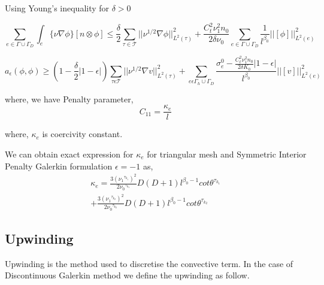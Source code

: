 \documentclass[a4paper]{book}
\begin{document}
Using Young's inequality for $\delta > 0$

\begin{equation}
\sum_{e \in \Gamma \cup \Gamma_D} \int_e \lbrace \nu \nabla \phi \rbrace [n \otimes \phi] \leq \frac{\delta}{2} \sum_{\tau \in \mathcal{T}} ||\nu^{1/2} \nabla \phi ||^2_{L^2(\tau)} +  \frac{C_t^2 \nu_1^2 n_0}{2 \delta \nu_0}  \sum_{e \in \Gamma \cup \Gamma_D} \frac{1}{l^{\beta_0}} ||[\phi]||^2_{L^2(e)}
\end{equation}


\begin{equation}
a_\epsilon (\phi , \phi) \geq \left( 1-\frac{\delta}{2} |1-\epsilon| \right) \sum_{\tau \epsilon \mathcal{T}} ||\nu^{1/2} \nabla v ||^2_{L^2(\tau)} + \sum_{e \epsilon \Gamma_h \cup \Gamma_D} \frac{\sigma_e^0 - \frac{C_t^2 \nu_1^2 n_0}{2 \delta K_0}|1-\epsilon|}{l^{\beta_0}} ||[v]||^2_{L^2(e)}
\end{equation}

where, we have Penalty parameter,
\begin{equation}
C_{11} = \frac{\kappa_e}{l}
\end{equation} 

where, $\kappa_e$ is coercivity constant.

We can obtain exact expression for $\kappa_e$ for triangular mesh and Symmetric Interior Penalty Galerkin formulation $\epsilon = -1$ as,\\
\begin{equation}
\begin{split}
\kappa_e = \frac{3 ( {\nu_1}^{\tau_{k_1}})^2}{2 {\nu_0}^{\tau_{k_1}}} D (D+1) l^{\beta_0 - 1} cot {\theta^{\tau_{k_1}}}  \\ + \frac{3 ( {\nu_1}^{\tau_{k_2}})^2}{2 {\nu_0}^{\tau_{k_2}}} D (D+1) l^{\beta_0 - 1} cot {\theta^{\tau_{k_2}}}
\end{split}
\end{equation} 

\subsection{Upwinding} \label{upwinding}

Upwinding is the method used to discretise the convective term. In the case of Discontinuous Galerkin method we define the upwinding as follow.\\
\end{document}

